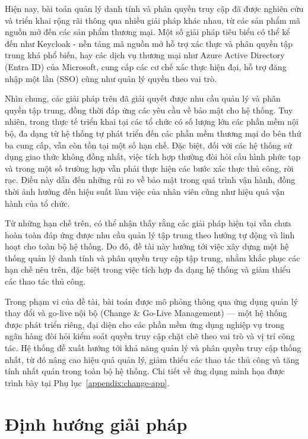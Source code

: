 \documentclass[../DoAn.tex]{subfiles}
\begin{document}
Hiện nay, bài toán quản lý danh tính và phân quyền truy cập đã được nghiên cứu và triển khai rộng rãi thông qua nhiều giải pháp khác nhau, từ các sản phẩm mã nguồn mở đến các sản phẩm thương mại. Một số giải pháp tiêu biểu có thể kể đến như Keycloak - nền tảng mã nguồn mở hỗ trợ xác thực và phân quyền tập trung khá phổ biến, hay các dịch vụ thương mại như Azure Active Directory (Entra ID) của Microsoft, cung cấp các cơ chế xác thực hiện đại, hỗ trợ đăng nhập một lần (SSO) cũng như quản lý quyền theo vai trò.

Nhìn chung, các giải pháp trên đã giải quyết được nhu cầu quản lý và phân quyền tập trung, đồng thời đáp ứng các yêu cầu về bảo mật cho hệ thống. Tuy nhiên, trong thực tế triển khai tại các tổ chức có số lượng lớn các phần mềm nội bộ, đa dạng từ hệ thống tự phát triển đến các phần mềm thương mại do bên thứ ba cung cấp, vẫn còn tồn tại một số hạn chế. Đặc biệt, đối với các hệ thống sử dụng giao thức không đồng nhất, việc tích hợp thường đòi hỏi cấu hình phức tạp và trong một số trường hợp vẫn phải thực hiện các bước xác thực thủ công, rời rạc. Điều này dẫn đến những rủi ro về bảo mật trong quá trình vận hành, đồng thời ảnh hưởng đến hiệu suất làm việc của nhân viên cũng như hiệu quả vận hành của tổ chức.

Từ những hạn chế trên, có thể nhận thấy rằng các giải pháp hiện tại vẫn chưa hoàn toàn đáp ứng được nhu cầu quản lý tập trung theo hướng tự động và linh hoạt cho toàn bộ hệ thống. Do đó, đề tài này hướng tới việc xây dựng một hệ thống quản lý danh tính và phân quyền truy cập tập trung, nhằm khắc phục các hạn chế nêu trên, đặc biệt trong việc tích hợp đa dạng hệ thống và giảm thiểu các thao tác thủ công.

Trong phạm vi của đề tài, bài toán được mô phỏng thông qua ứng dụng quản lý thay đổi và go-live nội bộ (Change \& Go-Live Management) --- một hệ thống được phát triển riêng, đại diện cho các phần mềm ứng dụng nghiệp vụ trong ngân hàng đòi hỏi kiểm soát quyền truy cập chặt chẽ theo vai trò và vị trí công tác. Hệ thống đề xuất hướng tới khả năng quản lý và phân quyền truy cập thống nhất, từ đó nâng cao hiệu quả quản lý, giảm thiểu các thao tác thủ công và tăng tính nhất quán trong toàn bộ hệ thống. Chi tiết về ứng dụng minh họa được trình bày tại Phụ lục~\ref{appendix:change-app}.


\section{Định hướng giải pháp}
\label{section:1.3}
\end{document}
